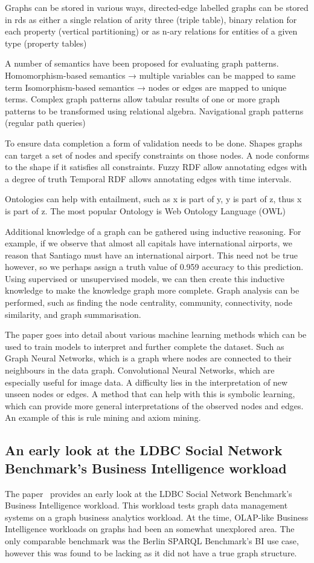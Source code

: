 Graphs can be stored in various ways, directed-edge labelled graphs can be stored in rds as either a single relation of arity three (triple table), binary relation for each property (vertical partitioning) or as n-ary relations for entities of a given type (property tables)

A number of semantics have been proposed for evaluating graph patterns. 
Homomorphism-based semantics → multiple variables can be mapped to same term
Isomorphism-based semantics → nodes or edges are mapped to unique terms. 
Complex graph patterns allow tabular results of one or more graph patterns to be transformed using relational algebra.
Navigational graph patterns  (regular path queries)

To ensure data completion a form of validation needs to be done. 
Shapes graphs can target a set of nodes and specify constraints on those nodes. A node conforms to the shape if it satisfies all constraints. 
Fuzzy RDF allow annotating edges with a degree of truth
Temporal RDF allows annotating edges with time intervals. 

Ontologies can help with entailment, such as x is part of y, y is part of z, thus x is part of z. 
The most popular Ontology is Web Ontology Language (OWL)

Additional knowledge of a graph can be gathered using inductive reasoning. For example, if we observe that almost all capitals have international airports, we reason that Santiago must have an international airport. This need not be true however, so we perhaps assign a truth value of 0.959 accuracy to this prediction. Using supervised or unsupervised models, we can then create this inductive knowledge to make the knowledge graph more complete. 
Graph analysis can be performed, such as finding the node centrality, community, connectivity, node similarity, and graph summarisation. 

The paper goes into detail about various machine learning methods which can be used to train models to interpret and further complete the dataset. Such as Graph Neural Networks, which is a graph where nodes are connected to their neighbours in the data graph. Convolutional Neural Networks, which are especially useful for image data. 
A difficulty lies in the interpretation of new unseen nodes or edges. A method that can help with this is symbolic learning, which can provide more general interpretations of the observed nodes and edges. An example of this is rule mining and axiom mining. 


\subsection{An early look at the LDBC Social Network Benchmark's Business Intelligence workload}
The paper~\cite{Szrnyas2018AnEL} provides an early look at the LDBC Social Network Benchmark's Business Intelligence workload. This workload tests graph data management systems on a graph business analytics workload. At the time, OLAP-like Business Intelligence workloads on graphs had been an somewhat unexplored area. The only comparable benchmark was the Berlin SPARQL Benchmark's BI use case, however this was found to be lacking as it did not have a true graph structure. 

